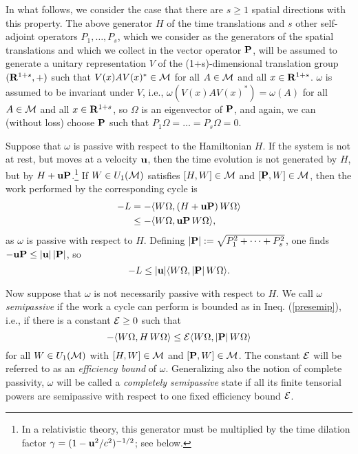 \documentclass[a4paper,11pt]{article}
\def\dt{\cal}
\def\dM{{\dt M}}
\def\E{{\cal E}}
\def\gO{\Omega}
\def\go{\omega}
\def\Rd{\reals^{1+s}}
\def\reals{{\bf R}}
\begin{document}
In what follows, we
consider the case that there are $s\geq1$ spatial directions with this
property. The above generator $H$
of the time translations and $s$ other self-adjoint operators
$P_1,\dots,P_s$, which we consider as the
generators of the spatial translations and which
we collect in the vector operator ${\bf P}$, will be assumed to
generate a unitary
representation $V$ of the (1+s)-dimensional translation group
$(\Rd,+)$ such that $V(x)AV(x)^*\in\dM$ for all $A\in\dM$ and all
$x\in\Rd$. $\go$ is assumed to be invariant under $V$, i.e.,
$\go(V(x)AV(x)^*)=\go(A)$ for all $A\in\dM$ and all
$x\in\Rd$, so $\gO$ is an eigenvector of ${\bf P}$, and
again, we can (without loss) choose ${\bf P}$ such that
$P_1\gO=\dots=P_s\gO=0$.

Suppose that $\go$ is passive with respect to the Hamiltonian $H$.
If the system is not at rest, but moves at a velocity ${\bf u}$,
then the time evolution is not generated by $H$, but by
$H+{\bf u P}$.\footnote{In a relativistic theory, this
generator must be multiplied by the time dilation factor
$\gamma=(1-{\bf u}^2/c^2)^{-1/2}$; see below.}
If $W\in U_1(\dM)$ satisfies $[H,W]\in\dM$ and $[{\bf P},W]\in\dM$,
then the work performed by the corresponding cycle is
\begin{align*}
-L&=-\langle W\gO,
(H+{\bf u}{\bf P})\,W\gO\rangle\\
&\leq-\langle W\gO,{\bf u}{\bf P}\,W\gO\rangle,
\end{align*}
as $\go$ is passive with respect to $H$.
Defining $|{\bf P}|:=\sqrt{P_1^2+\dots+P_s^2}$, one finds
$-{\bf u}{\bf P}\leq|{\bf u}|\,|{\bf P}|$,
so
\begin{equation}\label{presemip}
-L\leq |{\bf u}|\langle W\gO,|{\bf P}|\,W\gO\rangle.
\end{equation}

Now suppose that $\go$ is not necessarily passive with respect
to $H$. We call
$\go$ {\em semipassive} if the work a cycle can perform is
bounded as in Ineq. (\ref{presemip}), i.e., if
there is a constant $\E\geq0$ such that
\begin{equation}\label{semipassivity}
-\langle W\gO,H\,W\gO\rangle
\leq\E\langle W\gO,|{\bf P}|\,W\gO\rangle
\end{equation}
for all $W\in U_1(\dM)$ with
$[H,W]\in\dM$ and $[{\bf P},W]\in\dM$. The constant $\E$
will be referred to as an {\em efficiency bound} of $\go$.
Generalizing also the notion of complete passivity, $\go$
will be called a {\em completely semipassive}
state if all its finite tensorial powers are
semipassive with respect to one fixed efficiency bound $\E$.
\end{document}
